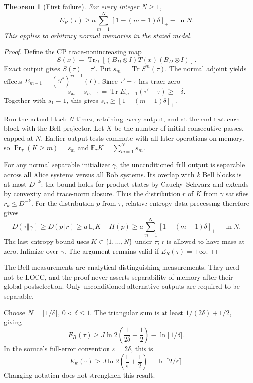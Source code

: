 \documentclass[11pt,a4paper]{article}
\numberwithin{equation}{section}
\newtheorem{theorem}{Theorem}[section]
\theoremstyle{remark}
\newcommand{\tr}{\operatorname{Tr}}
\newcommand{\ER}{E_R}
\newcommand{\pos}[1]{\left[#1\right]_+}
\begin{document}
\begin{theorem}[First failure]\label{thm:first}
For every integer \(N\geq1\),
\begin{equation}
 \ER(\tau)\geq
 a\sum_{m=1}^N\pos{1-(m-1)\delta}-\ln N.          \label{eq:first}
\end{equation}
This applies to arbitrary normal memories in the stated model.
\end{theorem}
\begin{proof}
Define the CP trace-nonincreasing map
\[
 S(x)=\tr_O[(B_D\otimes I)T(x)(B_D\otimes I)].
\]
Exact output gives \(S(\tau)=\tau'\). Put \(s_m=\tr S^m(\tau)\).
The normal adjoint yields effects \(E_{m-1}=(S^*)^{m-1}(I)\).
Since \(\tau'-\tau\) has trace zero,
\[
 s_m-s_{m-1}=\tr E_{m-1}(\tau'-\tau)\geq-\delta.
\]
Together with \(s_1=1\), this gives
\(s_m\geq[1-(m-1)\delta]_+\).

Run the actual block \(N\) times, retaining every output, and at the end
test each block with the Bell projector. Let \(K\) be the number of initial
consecutive passes, capped at \(N\). Earlier output tests commute with
all later operations on memory, so
\(\Pr_\tau(K\geq m)=s_m\) and \(\mathbb E_\tau K=\sum_{m=1}^Ns_m\).

For any normal separable initializer \(\gamma\), the unconditioned full
output is separable across all Alice systems versus all Bob systems.
Its overlap with \(k\) Bell blocks is at most \(D^{-k}\):
the bound holds for product states by Cauchy--Schwarz and extends by
convexity and trace-norm closure. Thus the distribution \(r\) of \(K\)
from \(\gamma\) satisfies \(r_k\leq D^{-k}\).
For the distribution \(p\) from \(\tau\), relative-entropy data processing
therefore gives
\[
 D(\tau\Vert\gamma)\geq D(p\Vert r)
 \geq a\,\mathbb E_\tau K-H(p)
 \geq a\sum_{m=1}^N[1-(m-1)\delta]_+-\ln N.
\]
The last entropy bound uses \(K\in\{1,\ldots,N\}\) under \(\tau\);
\(r\) is allowed to have mass at zero. Infimize over \(\gamma\).
The argument remains valid if \(\ER(\tau)=+\infty\).
\end{proof}
The Bell measurements are analytical distinguishing measurements.
They need not be LOCC, and the proof never asserts separability of memory
after their global postselection. Only unconditioned alternative outputs
are required to be separable.

Choose \(N=\lceil1/\delta\rceil\), \(0<\delta\leq1\). The triangular sum
is at least \(1/(2\delta)+1/2\), giving
\begin{equation}
 \ER(\tau)\geq
 J\ln2\left(\frac1{2\delta}+\frac12\right)
       -\ln\lceil1/\delta\rceil.                 \label{eq:bell-lower}
\end{equation}
In the source's full-error convention \(\varepsilon=2\delta\), this is
\[
 \ER(\tau)\geq
 J\ln2\left(\frac1{\varepsilon}+\frac12\right)
       -\ln\lceil2/\varepsilon\rceil.
\]
Changing notation does not strengthen this result.
\end{document}
